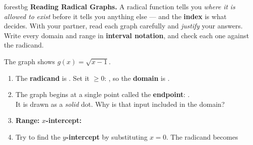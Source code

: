 \documentclass[10pt]{article}
\newcommand{\lgrid}[4]{%
  \draw[step=1, linegray!40, very thin] (#1,#3) grid (#2,#4);
  \draw[->, semithick, charcoal] (#1,0)--(#2,0) node[below right, font=\scriptsize]{$x$};
  \draw[->, semithick, charcoal] (0,#3)--(0,#4) node[left, font=\scriptsize]{$y$};}
\begin{document}
\namepartnerperiod

\vspace{0.08in}

\begin{headlinebox}{forestbg}
\small\textbf{Reading Radical Graphs.} A radical function tells you \emph{where it is allowed to
exist} before it tells you anything else --- and the \textbf{index} is what decides. With your
partner, read each graph carefully and \emph{justify} your answers. Write every domain and range in
\textbf{interval notation}, and check each one against the radicand.
\end{headlinebox}

\vspace{0.06in}

\begin{tcolorbox}[colback=white, colframe=black!40, title=\textbf{Tier R --- Remediate},
    fonttitle=\bfseries, arc=1.5mm, left=3mm, right=3mm, top=2mm, bottom=2mm, breakable]
The graph shows $g(x) = \sqrt{x-1}$.
\begin{center}
\end{center}
\begin{enumerate}[leftmargin=1.7em, itemsep=7pt]
  \item The \textbf{radicand} is \blank{2.0cm}. Set it $\ge 0$: \blank{2.4cm}, so the
        \textbf{domain} is \blank{3.0cm}.
  \item The graph begins at a single point called the \textbf{endpoint}: \blank{1.8cm}. \\
        It is drawn as a \emph{solid} dot. Why is that input included in the domain?
        \blank{5.4cm}
  \item \textbf{Range:} \blank{3.0cm} \quad \textbf{$x$-intercept:} \blank{1.8cm}
  \item Try to find the \textbf{$y$-intercept} by substituting $x=0$. The radicand becomes

\end{enumerate}
\end{tcolorbox}
\end{document}
